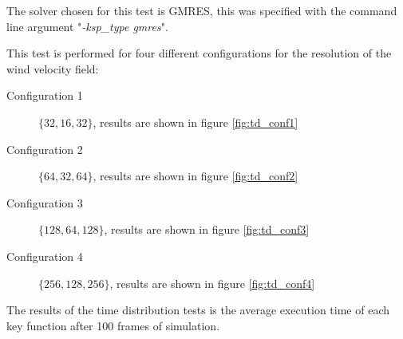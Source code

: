 The solver chosen for this test is GMRES, this was specified with the command
line argument "\emph{-ksp\_type gmres}".

This test is performed for four different configurations for the resolution of
the wind velocity field:
\begin{description}
	\item[Configuration 1] $ \{ 32, 16, 32 \} $, results are shown in figure
		\ref{fig:td_conf1}
	\item[Configuration 2] $ \{ 64, 32, 64 \} $, results are shown in figure
		\ref{fig:td_conf2} 
	\item[Configuration 3] $ \{ 128, 64, 128 \} $, results are shown in figure
		\ref{fig:td_conf3}
	\item[Configuration 4] $ \{ 256, 128, 256 \} $, results are shown in figure
		\ref{fig:td_conf4}
\end{description}

The results of the time distribution tests is the average execution time of each
key function after 100 frames of simulation.


